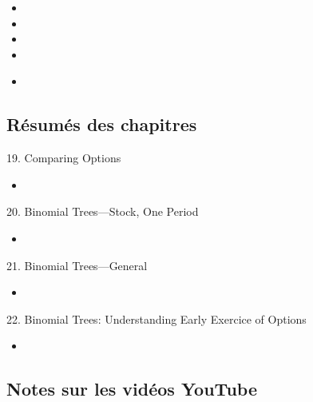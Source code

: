\begin{ASM_chapter}
\begin{itemize}
	\item	{}
	\item	{}
	\item	{}
	\item	{}
\end{itemize}
\end{ASM_chapter}

\begin{YTB_vids}
\begin{itemize}
	\item	
\end{itemize}
\end{YTB_vids}

\subsection{Résumés des chapitres}

\begin{CHPT_SUMM_AUTO}[label = {L.-19}]{19. Comparing Options}
	\begin{itemize}
		\item	
	\end{itemize}
\end{CHPT_SUMM_AUTO}

\begin{CHPT_SUMM_AUTO}[label = {L.-20}]{{20. Binomial Trees---Stock, One Period}}
	\begin{itemize}
		\item	
	\end{itemize}
\end{CHPT_SUMM_AUTO}

\begin{CHPT_SUMM_AUTO}[label = {L.-21}]{21. Binomial Trees---General}
	\begin{itemize}
		\item	
	\end{itemize}
\end{CHPT_SUMM_AUTO}

\begin{CHPT_SUMM_AUTO}[label = {L.-22}]{22. Binomial Trees: Understanding Early Exercice of Options}
	\begin{itemize}
		\item	
	\end{itemize}
\end{CHPT_SUMM_AUTO}

\subsection{Notes sur les vidéos YouTube}

